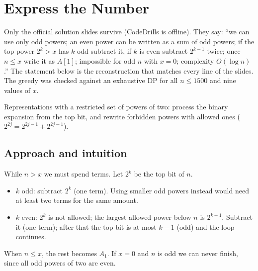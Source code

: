 \section{Express the Number}
\label{sec:b-express}

\begin{reconbox}
Only the official solution slides survive (CodeDrills is offline). They say:
``we can use only odd powers; an even power can be written as a sum of odd
powers; if the top power $2^k>x$ has $k$ odd subtract it, if $k$ is even
subtract $2^{k-1}$ twice; once $n\le x$ write it as $A[1]$; impossible for odd
$n$ with $x=0$; complexity $O(\log n)$.'' The statement below is the
reconstruction that matches every line of the slides. The greedy was checked
against an exhaustive DP for all $n\le1500$ and nine values of $x$.
\end{reconbox}


\begin{patternbox}
Representations with a restricted set of powers of two: process the binary
expansion from the top bit, and rewrite forbidden powers with allowed ones
($2^{2j}=2^{2j-1}+2^{2j-1}$).
\end{patternbox}

\subsection*{Approach and intuition}

While $n>x$ we must spend terms. Let $2^k$ be the top bit of $n$.
\begin{itemize}
  \item $k$ odd: subtract $2^k$ (one term). Using smaller odd powers instead
        would need at least two terms for the same amount.
  \item $k$ even: $2^k$ is not allowed; the largest allowed power below $n$ is
        $2^{k-1}$. Subtract it (one term); after that the top bit is at most
        $k-1$ (odd) and the loop continues.
\end{itemize}
When $n\le x$, the rest becomes $A_1$. If $x=0$ and $n$ is odd we can never
finish, since all odd powers of two are even.


